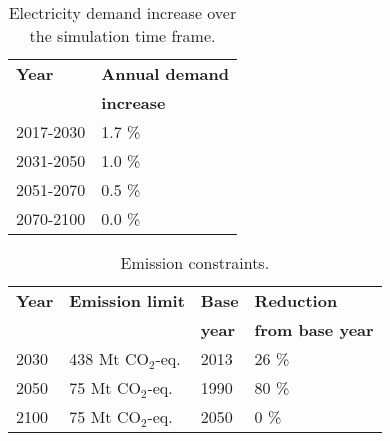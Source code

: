 \begin{table}[!ht]
	\caption{Electricity demand increase over the simulation time frame.}
	\vspace{0.1in}
	\begin{tabularx}{0.4\textwidth}{p{} p{}}
		\hline
\textbf{Year} & \textbf{Annual demand} \\
 & \textbf{increase} \\
\hline
2017-2030 & 1.7 \% \cite{noauthor_electricity_2019} \\
2031-2050 & 1.0 \% \\
2051-2070 & 0.5 \% \\
2070-2100 & 0.0 \% \\
\hline 
	\end{tabularx}
\label{demand}
\end{table}

\begin{table}[!ht]
	\caption{Emission constraints.}
	\vspace{0.1in}
	\begin{tabularx}{0.6\textwidth}{p{} p{}p{} p{}}
		\hline
\textbf{Year} & \textbf{Emission limit} & \textbf{Base} & \textbf{Reduction} \\
 & & \textbf{year} & \textbf{from base year} \\
\hline
2030 & 438 Mt CO$_2$-eq. & 2013 & 26 \% \\
2050 & 75 Mt CO$_2$-eq. & 1990 & 80 \% \\
2100 & 75 Mt CO$_2$-eq. & 2050 & 0 \% \\
\hline 
	\end{tabularx}
\label{co2-limits}
\end{table}

